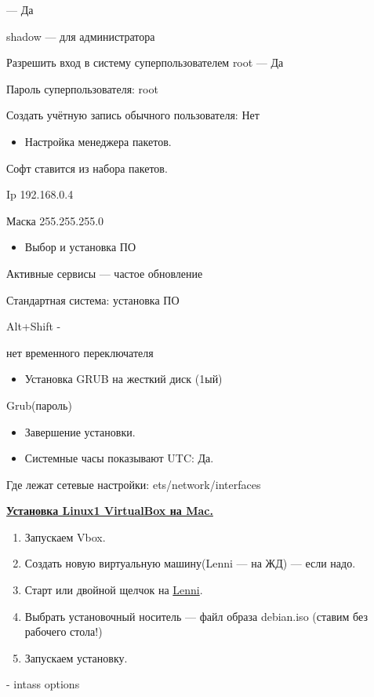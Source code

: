 — Да
\par 
shadow — для администратора
\par 
Разрешить вход в систему суперпользователем
root — Да
\par 
Пароль суперпользователя: root
\par 
Создать учётную запись обычного
пользователя: Нет
\begin{itemize}
	\item \par 
	Настройка менеджера пакетов.
\end{itemize}
\par 
Софт ставится из набора пакетов.
\par 
Ip 192.168.0.4
\par 
Маска 255.255.255.0
\begin{itemize}
	\item \par 
	Выбор и установка ПО
\end{itemize}
\par 
Активные сервисы — частое обновление
\par 
Стандартная система: установка ПО
\par 
Alt+Shift -
\par 
нет временного переключателя
\begin{itemize}
	\item \par 
	Установка GRUB на жесткий диск (1ый)
\end{itemize}
\par 
Grub(пароль)
\begin{itemize}
	\item \par 
	Завершение установки.
\end{itemize}
\begin{itemize}
	\item \par 
	Системные часы показывают UTC: Да.
\end{itemize}
\par 
Где лежат сетевые настройки:
ets/network/interfaces
\par 


\par 
\underline{\textbf{Установка Linux1 VirtualBox на Mac.}}
\begin{enumerate}
	\item \par 
	Запускаем Vbox.
	\item \par 
	Создать новую виртуальную машину(Lenni
	— на ЖД) — если надо.
	\item \par Старт
	или двойной щелчок на \underline{Lenni}.
	\item \par 
	Выбрать установочный носитель — файл
	образа debian.iso (ставим без рабочего
	стола!)
	\item \par 
	Запускаем установку.
\end{enumerate}
\par 
- intass options 

